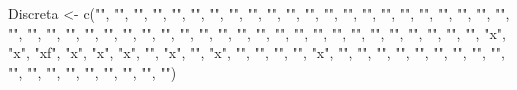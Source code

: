 \documentclass[
]{article}
\newenvironment{Shaded}{\begin{snugshade}}{\end{snugshade}}
\newcommand{\FunctionTok}[1]{\textcolor[rgb]{0.00,0.00,0.00}{#1}}
\newcommand{\NormalTok}[1]{#1}
\newcommand{\OtherTok}[1]{\textcolor[rgb]{0.56,0.35,0.01}{#1}}
\newcommand{\StringTok}[1]{\textcolor[rgb]{0.31,0.60,0.02}{#1}}
\begin{document}
\begin{Shaded}
\begin{Highlighting}[]
\NormalTok{Discreta }\OtherTok{\textless{}{-}} \FunctionTok{c}\NormalTok{(}\StringTok{""}\NormalTok{, }\StringTok{""}\NormalTok{, }\StringTok{""}\NormalTok{, }\StringTok{""}\NormalTok{, }\StringTok{""}\NormalTok{, }\StringTok{""}\NormalTok{, }\StringTok{""}\NormalTok{, }\StringTok{""}\NormalTok{, }\StringTok{""}\NormalTok{, }\StringTok{""}\NormalTok{, }\StringTok{""}\NormalTok{, }\StringTok{""}\NormalTok{, }\StringTok{""}\NormalTok{, }\StringTok{""}\NormalTok{, }\StringTok{""}\NormalTok{, }\StringTok{""}\NormalTok{, }\StringTok{""}\NormalTok{, }\StringTok{""}\NormalTok{, }\StringTok{""}\NormalTok{, }\StringTok{""}\NormalTok{, }\StringTok{""}\NormalTok{, }\StringTok{""}\NormalTok{, }\StringTok{""}\NormalTok{, }\StringTok{""}\NormalTok{, }\StringTok{""}\NormalTok{, }\StringTok{""}\NormalTok{, }\StringTok{""}\NormalTok{, }\StringTok{""}\NormalTok{, }\StringTok{""}\NormalTok{, }\StringTok{""}\NormalTok{, }\StringTok{""}\NormalTok{, }\StringTok{""}\NormalTok{, }\StringTok{""}\NormalTok{, }\StringTok{""}\NormalTok{, }\StringTok{""}\NormalTok{, }\StringTok{""}\NormalTok{, }\StringTok{""}\NormalTok{, }\StringTok{""}\NormalTok{, }\StringTok{""}\NormalTok{, }\StringTok{""}\NormalTok{, }\StringTok{""}\NormalTok{, }\StringTok{""}\NormalTok{, }\StringTok{""}\NormalTok{, }\StringTok{""}\NormalTok{, }\StringTok{""}\NormalTok{, }\StringTok{""}\NormalTok{, }\StringTok{""}\NormalTok{, }\StringTok{"x"}\NormalTok{, }\StringTok{"x"}\NormalTok{, }\StringTok{"xf"}\NormalTok{, }\StringTok{"x"}\NormalTok{, }\StringTok{"x"}\NormalTok{, }\StringTok{"x"}\NormalTok{, }\StringTok{""}\NormalTok{, }\StringTok{"x"}\NormalTok{, }\StringTok{""}\NormalTok{, }\StringTok{"x"}\NormalTok{, }\StringTok{""}\NormalTok{, }\StringTok{""}\NormalTok{, }\StringTok{""}\NormalTok{, }\StringTok{""}\NormalTok{, }\StringTok{"x"}\NormalTok{, }\StringTok{""}\NormalTok{, }\StringTok{""}\NormalTok{, }\StringTok{""}\NormalTok{, }\StringTok{""}\NormalTok{, }\StringTok{""}\NormalTok{, }\StringTok{""}\NormalTok{, }\StringTok{""}\NormalTok{, }\StringTok{""}\NormalTok{, }\StringTok{""}\NormalTok{, }\StringTok{""}\NormalTok{, }\StringTok{""}\NormalTok{, }\StringTok{""}\NormalTok{, }\StringTok{""}\NormalTok{, }\StringTok{""}\NormalTok{, }\StringTok{""}\NormalTok{, }\StringTok{""}\NormalTok{, }\StringTok{""}\NormalTok{, }\StringTok{""}\NormalTok{)}

\end{Highlighting}
\end{Shaded}
\end{document}
